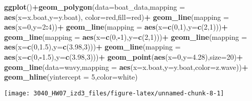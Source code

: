 \documentclass[
]{article}
\newenvironment{Shaded}{\begin{snugshade}}{\end{snugshade}}
\newcommand{\AttributeTok}[1]{\textcolor[rgb]{0.13,0.29,0.53}{#1}}
\newcommand{\DecValTok}[1]{\textcolor[rgb]{0.00,0.00,0.81}{#1}}
\newcommand{\FloatTok}[1]{\textcolor[rgb]{0.00,0.00,0.81}{#1}}
\newcommand{\FunctionTok}[1]{\textcolor[rgb]{0.13,0.29,0.53}{\textbf{#1}}}
\newcommand{\NormalTok}[1]{#1}
\newcommand{\SpecialCharTok}[1]{\textcolor[rgb]{0.81,0.36,0.00}{\textbf{#1}}}
\newcommand{\StringTok}[1]{\textcolor[rgb]{0.31,0.60,0.02}{#1}}
\begin{document}
\begin{Shaded}
\begin{Highlighting}[]
\FunctionTok{ggplot}\NormalTok{()}\SpecialCharTok{+}\FunctionTok{geom\_polygon}\NormalTok{(}\AttributeTok{data=}\NormalTok{boat\_data,}\AttributeTok{mapping =} \FunctionTok{aes}\NormalTok{(}\AttributeTok{x=}\NormalTok{x.boat,}\AttributeTok{y=}\NormalTok{y.boat),}
                      \AttributeTok{color=}\StringTok{\textquotesingle{}red\textquotesingle{}}\NormalTok{,}\AttributeTok{fill=}\StringTok{\textquotesingle{}red\textquotesingle{}}\NormalTok{)}\SpecialCharTok{+}
    \FunctionTok{geom\_line}\NormalTok{(}\AttributeTok{mapping =} \FunctionTok{aes}\NormalTok{(}\AttributeTok{x=}\DecValTok{0}\NormalTok{,}\AttributeTok{y=}\DecValTok{2}\SpecialCharTok{:}\DecValTok{4}\NormalTok{))}\SpecialCharTok{+}
    \FunctionTok{geom\_line}\NormalTok{(}\AttributeTok{mapping =} \FunctionTok{aes}\NormalTok{(}\AttributeTok{x=}\FunctionTok{c}\NormalTok{(}\DecValTok{0}\NormalTok{,}\DecValTok{1}\NormalTok{),}\AttributeTok{y=}\FunctionTok{c}\NormalTok{(}\DecValTok{2}\NormalTok{,}\DecValTok{1}\NormalTok{)))}\SpecialCharTok{+}
    \FunctionTok{geom\_line}\NormalTok{(}\AttributeTok{mapping =} \FunctionTok{aes}\NormalTok{(}\AttributeTok{x=}\FunctionTok{c}\NormalTok{(}\DecValTok{0}\NormalTok{,}\SpecialCharTok{{-}}\DecValTok{1}\NormalTok{),}\AttributeTok{y=}\FunctionTok{c}\NormalTok{(}\DecValTok{2}\NormalTok{,}\DecValTok{1}\NormalTok{)))}\SpecialCharTok{+}
    \FunctionTok{geom\_line}\NormalTok{(}\AttributeTok{mapping =} \FunctionTok{aes}\NormalTok{(}\AttributeTok{x=}\FunctionTok{c}\NormalTok{(}\DecValTok{0}\NormalTok{,}\FloatTok{1.5}\NormalTok{),}\AttributeTok{y=}\FunctionTok{c}\NormalTok{(}\FloatTok{3.98}\NormalTok{,}\DecValTok{3}\NormalTok{)))}\SpecialCharTok{+}
    \FunctionTok{geom\_line}\NormalTok{(}\AttributeTok{mapping =} \FunctionTok{aes}\NormalTok{(}\AttributeTok{x=}\FunctionTok{c}\NormalTok{(}\DecValTok{0}\NormalTok{,}\SpecialCharTok{{-}}\FloatTok{1.5}\NormalTok{),}\AttributeTok{y=}\FunctionTok{c}\NormalTok{(}\FloatTok{3.98}\NormalTok{,}\DecValTok{3}\NormalTok{)))}\SpecialCharTok{+}
    \FunctionTok{geom\_point}\NormalTok{(}\FunctionTok{aes}\NormalTok{(}\AttributeTok{x=}\DecValTok{0}\NormalTok{,}\AttributeTok{y=}\FloatTok{4.28}\NormalTok{),}\AttributeTok{size=}\DecValTok{20}\NormalTok{)}\SpecialCharTok{+}
    \FunctionTok{geom\_line}\NormalTok{(}\AttributeTok{data=}\NormalTok{wavy,}\AttributeTok{mapping =} \FunctionTok{aes}\NormalTok{(}\AttributeTok{x=}\NormalTok{x.boat,}\AttributeTok{y=}\NormalTok{y.boat,}\AttributeTok{color=}\NormalTok{z.wave))}\SpecialCharTok{+}
    \FunctionTok{geom\_hline}\NormalTok{(}\AttributeTok{yintercept =} \DecValTok{5}\NormalTok{,}\AttributeTok{color=}\StringTok{\textquotesingle{}white\textquotesingle{}}\NormalTok{)}
\end{Highlighting}
\end{Shaded}

\texttt{[image: 3040\_HW07\_izd3\_files/figure-latex/unnamed-chunk-8-1]}
\end{document}

